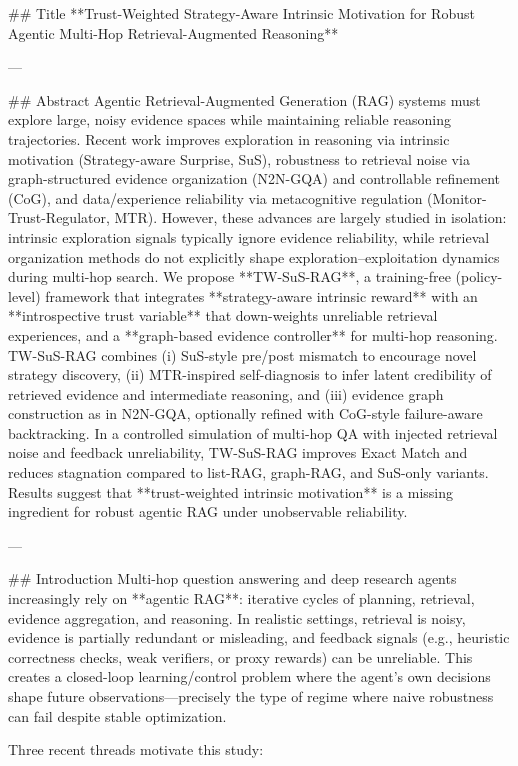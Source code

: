 ## Title  
**Trust-Weighted Strategy-Aware Intrinsic Motivation for Robust Agentic Multi-Hop Retrieval-Augmented Reasoning**

---

## Abstract  
Agentic Retrieval-Augmented Generation (RAG) systems must explore large, noisy evidence spaces while maintaining reliable reasoning trajectories. Recent work improves exploration in reasoning via intrinsic motivation (Strategy-aware Surprise, SuS), robustness to retrieval noise via graph-structured evidence organization (N2N-GQA) and controllable refinement (CoG), and data/experience reliability via metacognitive regulation (Monitor-Trust-Regulator, MTR). However, these advances are largely studied in isolation: intrinsic exploration signals typically ignore evidence reliability, while retrieval organization methods do not explicitly shape exploration–exploitation dynamics during multi-hop search. We propose **TW-SuS-RAG**, a training-free (policy-level) framework that integrates **strategy-aware intrinsic reward** with an **introspective trust variable** that down-weights unreliable retrieval experiences, and a **graph-based evidence controller** for multi-hop reasoning. TW-SuS-RAG combines (i) SuS-style pre/post mismatch to encourage novel strategy discovery, (ii) MTR-inspired self-diagnosis to infer latent credibility of retrieved evidence and intermediate reasoning, and (iii) evidence graph construction as in N2N-GQA, optionally refined with CoG-style failure-aware backtracking. In a controlled simulation of multi-hop QA with injected retrieval noise and feedback unreliability, TW-SuS-RAG improves Exact Match and reduces stagnation compared to list-RAG, graph-RAG, and SuS-only variants. Results suggest that **trust-weighted intrinsic motivation** is a missing ingredient for robust agentic RAG under unobservable reliability.

---

## Introduction  
Multi-hop question answering and deep research agents increasingly rely on **agentic RAG**: iterative cycles of planning, retrieval, evidence aggregation, and reasoning. In realistic settings, retrieval is noisy, evidence is partially redundant or misleading, and feedback signals (e.g., heuristic correctness checks, weak verifiers, or proxy rewards) can be unreliable. This creates a closed-loop learning/control problem where the agent’s own decisions shape future observations—precisely the type of regime where naive robustness can fail despite stable optimization.

Three recent threads motivate this study:

